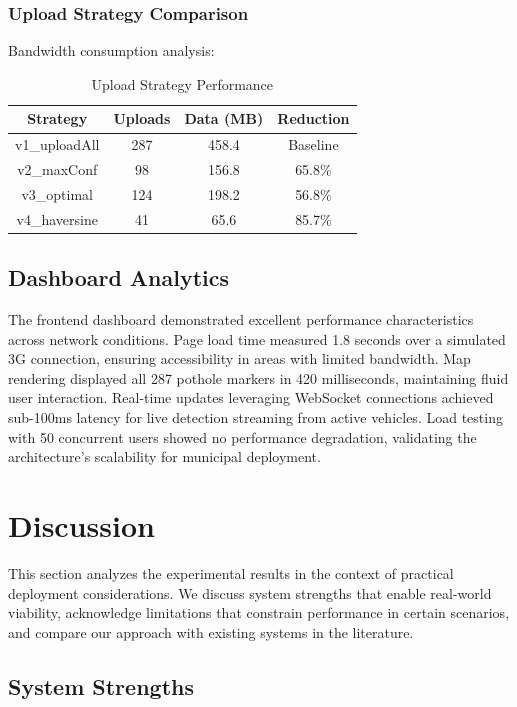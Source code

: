 \documentclass{ieeeaccess}
\begin{document}
\subsubsection{Upload Strategy Comparison}
Bandwidth consumption analysis:
\begin{table}[h]
\caption{Upload Strategy Performance}
\centering
\begin{tabular}{@{}cccc@{}}
\toprule
\textbf{Strategy} & \textbf{Uploads} & \textbf{Data (MB)} & \textbf{Reduction} \\ \midrule
v1\_uploadAll & 287 & 458.4 & Baseline \\
v2\_maxConf & 98 & 156.8 & 65.8\% \\
v3\_optimal & 124 & 198.2 & 56.8\% \\
v4\_haversine & 41 & 65.6 & 85.7\% \\ \bottomrule
\end{tabular}
\end{table}

\subsection{Dashboard Analytics}
The frontend dashboard demonstrated excellent performance characteristics across network conditions. Page load time measured 1.8 seconds over a simulated 3G connection, ensuring accessibility in areas with limited bandwidth. Map rendering displayed all 287 pothole markers in 420 milliseconds, maintaining fluid user interaction. Real-time updates leveraging WebSocket connections achieved sub-100ms latency for live detection streaming from active vehicles. Load testing with 50 concurrent users showed no performance degradation, validating the architecture's scalability for municipal deployment.

\section{Discussion}

This section analyzes the experimental results in the context of practical deployment considerations. We discuss system strengths that enable real-world viability, acknowledge limitations that constrain performance in certain scenarios, and compare our approach with existing systems in the literature.

\subsection{System Strengths}
\end{document}
